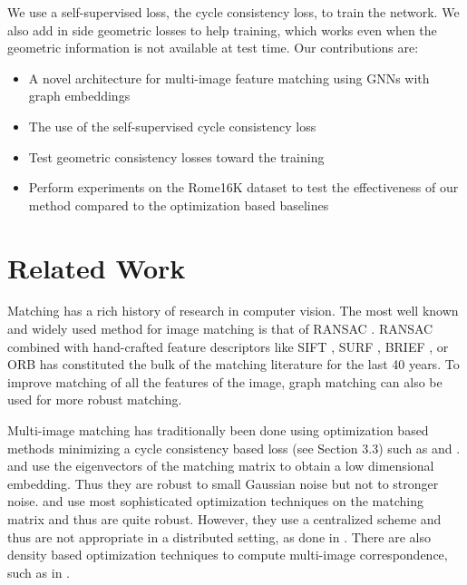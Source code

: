 \documentclass[10pt,twocolumn,letterpaper]{article}
\begin{document}
We use a self-supervised loss, the cycle consistency loss, to train the network.
We also add in side geometric losses to help training, which works even when the geometric information is not available at test time.
Our contributions are:
\begin{itemize}
\item A novel architecture for multi-image feature matching using GNNs with graph embeddings
\item The use of the self-supervised cycle consistency loss
\item Test geometric consistency losses toward the training
\item Perform experiments on the Rome16K \cite{li2010location} dataset to test the effectiveness of our method compared to the optimization based baselines
\end{itemize}


\section{Related Work}

Matching has a rich history of research in computer vision.
The most well known and widely used method for image matching is that of RANSAC \cite{fischler1981random}.
RANSAC combined with hand-crafted feature descriptors like SIFT \cite{lowe2004distinctive}, SURF \cite{bay2006surf}, BRIEF \cite{calonder2012brief}, or ORB \cite{mur2015orb} has constituted the bulk of the matching literature for the last 40 years.
To improve matching of all the features of the image, graph matching \cite{suh2015subgraph, hu2016distributable} can also be used for more robust matching.

Multi-image matching has traditionally been done using optimization based methods minimizing a cycle consistency based loss (see Section 3.3) such as \cite{pachauri2013solving,zhou2015multi,arrigoni2017synchronization} and \cite{wang2017multi}.
\cite{pachauri2013solving} and \cite{arrigoni2017synchronization} use the eigenvectors of the matching matrix to obtain a low dimensional embedding. 
Thus they are robust to small Gaussian noise but not to stronger noise.
\cite{zhou2015multi} and \cite{wang2017multi} use most sophisticated optimization techniques on the matching matrix and thus are quite robust.
However, they use a centralized scheme and thus are not appropriate in a distributed setting,
as done in \cite{leonardos2016distributed}.
There are also density based optimization techniques to compute multi-image correspondence, such as in \cite{tron2017fast}.
\end{document}

